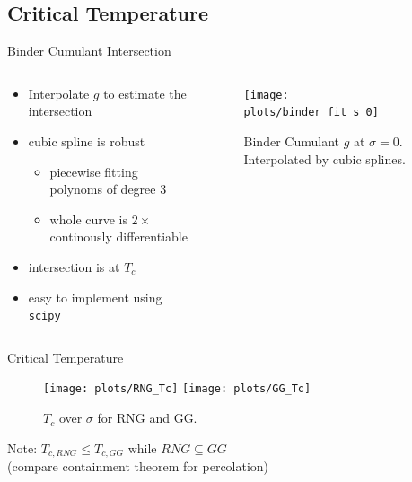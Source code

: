 \documentclass{beamer}
\begin{document}
    \subsection{Critical Temperature}
        \begin{frame}{Binder Cumulant Intersection}
            \begin{columns}[t]
                \begin{column}{5cm}
                    \begin{itemize}[<+->]
                        \item Interpolate \(g\) to estimate the intersection
                        \item cubic spline is robust
                        \begin{itemize}[<+->]
                            \item piecewise fitting polynoms of degree 3
                            \item whole curve is \(2 \times\) continously differentiable
                        \end{itemize}
                        \item intersection is at \(T_{c}\) \cite{Binder1981}
                        \item easy to implement using \texttt{scipy}
                    \end{itemize}
                \end{column}
                \begin{column}{6cm}
                    \begin{figure}[htbp]
                        \centering
                        \texttt{[image: plots/binder\_fit\_s\_0]}
                        \caption
                        {
                            Binder Cumulant \(g\) at \(\sigma = 0\).
                            Interpolated by cubic splines.
                        }
                        \label{fig:gettingCrit:binder_fit_s_0}
                    \end{figure}
                \end{column}
            \end{columns}
        \end{frame}

        \begin{frame}{Critical Temperature}
            \begin{figure}[htbp]
                \centering
                \subfigure
                {
                    \label{sfig:Tc:RNG}
                    \texttt{[image: plots/RNG\_Tc]}
                }
                \subfigure
                {
                    \label{sfig:Tc:GG}
                    \texttt{[image: plots/GG\_Tc]}
                }
                \caption
                {
                    \(T_c\) over \(\sigma\) for RNG and GG.
                }
                \label{fig:Tc}
            \end{figure}
            \pause
            Note: \(T_{c,RNG} \le T_{c,GG}\) while \(RNG \subseteq GG\)\\
            (compare containment theorem \cite{fisher} for percolation)
        \end{frame}
\end{document}
